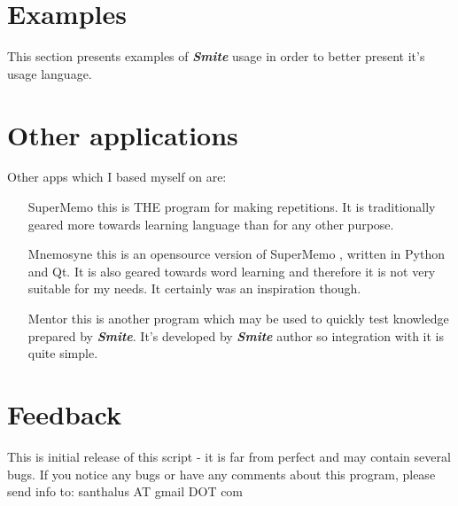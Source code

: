 \documentclass[a4paper,11pt]{article}
\newcommand{\smite}{\emph{\textbf{Smite{}}}}
\begin{document}

\section{Examples}
This section presents examples of \smite{} usage in order to better present
it's usage language.




\section{Other applications}

Other apps which I based myself on are:
\begin{enumerate}

\item[SuperMemo] this is THE program for making repetitions. It is
  traditionally geared more towards learning language than for any other
  purpose.

\item[Mnemosyne]this is an opensource version of SuperMemo , written in
Python and Qt. It is also geared towards word learning and therefore it
is not very suitable for my needs. It certainly was an inspiration
though.

\item[Mentor] this is another program which may be used to quickly test knowledge prepared by \smite{}.
It's developed by \smite{} author so integration with it is quite simple.

\end{enumerate}

\section{Feedback}
This is initial release of this script - it is far from perfect and may
contain several bugs.
If you notice any bugs or have any comments about this program, please
send info to: santhalus AT gmail DOT com




\end{document}
